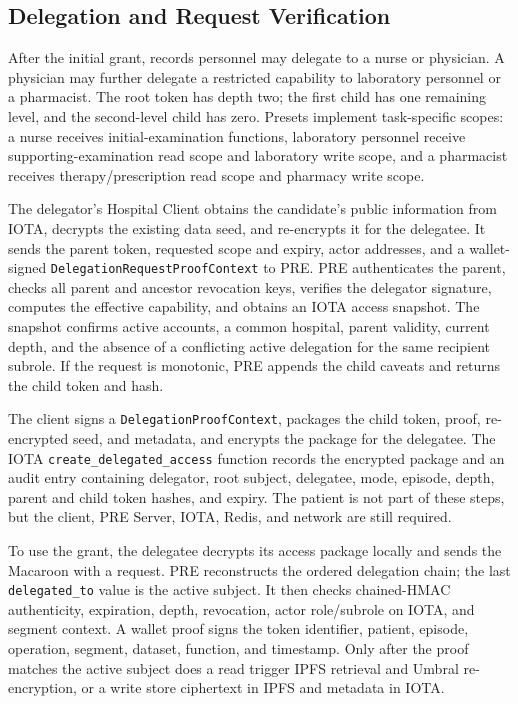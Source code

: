 \documentclass[conference,a4paper,english]{IEEEtran}
\begin{document}
\subsection{Delegation and Request Verification}

After the initial grant, records personnel may delegate to a nurse or physician. A physician may further delegate a restricted capability to laboratory personnel or a pharmacist. The root token has depth two; the first child has one remaining level, and the second-level child has zero. Presets implement task-specific scopes: a nurse receives initial-examination functions, laboratory personnel receive supporting-examination read scope and laboratory write scope, and a pharmacist receives therapy/prescription read scope and pharmacy write scope.

The delegator's Hospital Client obtains the candidate's public information from IOTA, decrypts the existing data seed, and re-encrypts it for the delegatee. It sends the parent token, requested scope and expiry, actor addresses, and a wallet-signed \texttt{DelegationRequestProofContext} to PRE. PRE authenticates the parent, checks all parent and ancestor revocation keys, verifies the delegator signature, computes the effective capability, and obtains an IOTA access snapshot. The snapshot confirms active accounts, a common hospital, parent validity, current depth, and the absence of a conflicting active delegation for the same recipient subrole. If the request is monotonic, PRE appends the child caveats and returns the child token and hash.

The client signs a \texttt{DelegationProofContext}, packages the child token, proof, re-encrypted seed, and metadata, and encrypts the package for the delegatee. The IOTA \texttt{create\_delegated\_access} function records the encrypted package and an audit entry containing delegator, root subject, delegatee, mode, episode, depth, parent and child token hashes, and expiry. The patient is not part of these steps, but the client, PRE Server, IOTA, Redis, and network are still required.

To use the grant, the delegatee decrypts its access package locally and sends the Macaroon with a request. PRE reconstructs the ordered delegation chain; the last \texttt{delegated\_to} value is the active subject. It then checks chained-HMAC authenticity, expiration, depth, revocation, actor role/subrole on IOTA, and segment context. A wallet proof signs the token identifier, patient, episode, operation, segment, dataset, function, and timestamp. Only after the proof matches the active subject does a read trigger IPFS retrieval and Umbral re-encryption, or a write store ciphertext in IPFS and metadata in IOTA.
\end{document}
